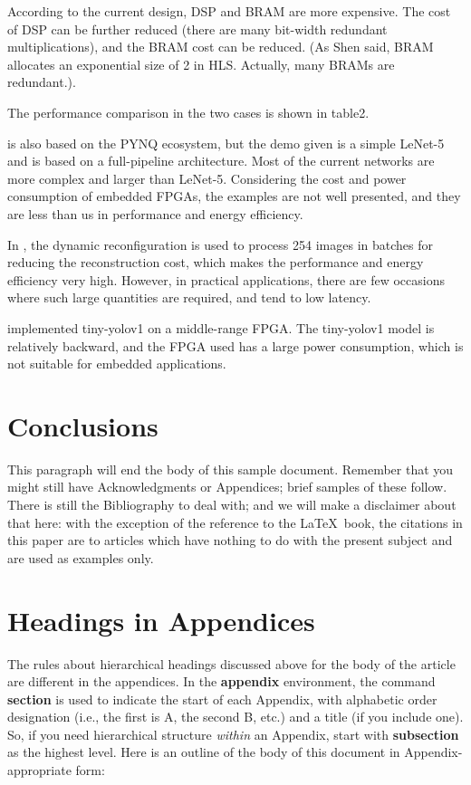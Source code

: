 According to the current design, DSP and BRAM are more expensive. The cost of DSP can be further reduced (there are many bit-width redundant multiplications), and the BRAM cost can be reduced. (As Shen \cite{shen2017maximizing} said, BRAM allocates an exponential size of 2 in HLS. Actually, many BRAMs are redundant.).

The performance comparison in the two cases is shown in table2.

\cite{wang2018pynq} is also based on the PYNQ ecosystem, but the demo given is a simple LeNet-5 and is based on a full-pipeline architecture. Most of the current networks are more complex and larger than LeNet-5. Considering the cost and power consumption of embedded FPGAs, the examples are not well presented, and they are less than us in performance and energy efficiency. 

In \cite{venieris2016fpgaconvnet}, the dynamic reconfiguration is used to process 254 images in batches for reducing the reconstruction cost, which makes the performance and energy efficiency very high. However, in practical applications, there are few occasions where such large quantities are required, and tend to low latency.

\cite{ma2017hardware} implemented tiny-yolov1 on a middle-range FPGA. The tiny-yolov1 model is relatively backward, and the FPGA used has a large power consumption, which is not suitable for embedded applications.

\section{Conclusions}
This paragraph will end the body of this sample document.
Remember that you might still have Acknowledgments or
Appendices; brief samples of these
follow.  There is still the Bibliography to deal with; and
we will make a disclaimer about that here: with the exception
of the reference to the \LaTeX\ book, the citations in
this paper are to articles which have nothing to
do with the present subject and are used as
examples only.



\appendix
\section{Headings in Appendices}
The rules about hierarchical headings discussed above for
the body of the article are different in the appendices.
In the \textbf{appendix} environment, the command
\textbf{section} is used to
indicate the start of each Appendix, with alphabetic order
designation (i.e., the first is A, the second B, etc.) and
a title (if you include one).  So, if you need
hierarchical structure
\textit{within} an Appendix, start with \textbf{subsection} as the
highest level. Here is an outline of the body of this
document in Appendix-appropriate form:
